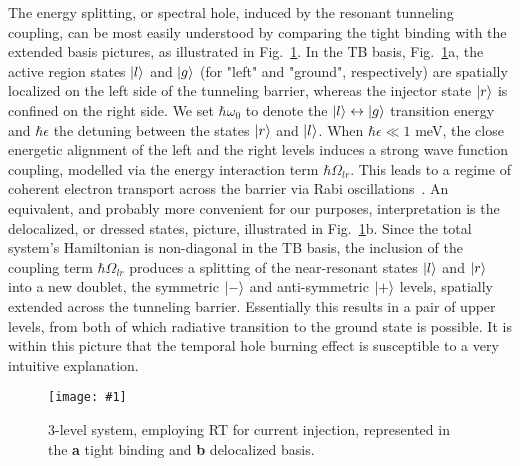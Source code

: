 \documentclass[onecolumn,secnumarabic,amssymb, nobibnotes, aip, prd]{revtex4-1}
\newcommand{\includegraphicsXL}[1]{\texttt{[image: \#1]}}
\begin{document}
The energy splitting, or spectral hole, induced by the resonant tunneling coupling, can be most easily understood by comparing the tight binding with the extended basis pictures, as illustrated in Fig.~\ref{fig:basisnew}. In the TB basis, Fig.~\ref{fig:basisnew}a, the active region states $\ket{l}$ and $\ket{g}$ (for "left" and "ground", respectively) are spatially localized on the left side of the tunneling barrier, whereas the injector state $\ket{r}$ is confined on the right side. We set $\hbar\omega_0$ to denote the $\ket{l} \leftrightarrow \ket{g}$ transition energy and $\hbar\epsilon$ the detuning between the states $\ket{r}$ and $\ket{l}$. When $\hbar \epsilon \ll 1 $ meV, the close energetic alignment of the left and the right levels induces a strong wave function coupling, modelled via the energy interaction term $\hbar\Omega_{lr}$. This leads to a regime of coherent electron transport across the barrier via Rabi oscillations~\cite{callebaut2005importance}. An equivalent, and probably more convenient for our purposes, interpretation is the delocalized, or dressed states, picture, illustrated in Fig.~\ref{fig:basisnew}b. Since the total system's Hamiltonian is non-diagonal in the TB basis, the inclusion of the coupling term $\hbar\Omega_{lr}$ produces a splitting of the near-resonant states $\ket{l}$ and $\ket{r}$ into a new doublet, the symmetric $\ket{-}$ and anti-symmetric $\ket{+}$ levels, spatially extended across the tunneling barrier. Essentially this results in a pair of upper levels, from both of which radiative transition to the ground state is possible. It is within this picture that the temporal hole burning effect is susceptible to a very intuitive explanation. 
\begin{figure}[h!]
	\begin{center}
		\includegraphicsXL{IMGS/basisnew.eps}
		\caption{3-level system, employing RT for current injection, represented in the \textbf{a} tight binding and \textbf{b} delocalized basis.} \label{fig:basisnew}
	\end{center}	
\end{figure}
\end{document}
